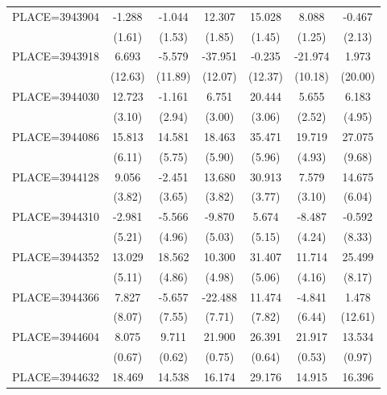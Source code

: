 {\begin{tabular}{l*{6}{c}}
PLACE=3943904       &      -1.288&      -1.044&      12.307&      15.028&       8.088&      -0.467\\
                    &      (1.61)&      (1.53)&      (1.85)&      (1.45)&      (1.25)&      (2.13)\\
PLACE=3943918       &       6.693&      -5.579&     -37.951&      -0.235&     -21.974&       1.973\\
                    &     (12.63)&     (11.89)&     (12.07)&     (12.37)&     (10.18)&     (20.00)\\
PLACE=3944030       &      12.723&      -1.161&       6.751&      20.444&       5.655&       6.183\\
                    &      (3.10)&      (2.94)&      (3.00)&      (3.06)&      (2.52)&      (4.95)\\
PLACE=3944086       &      15.813&      14.581&      18.463&      35.471&      19.719&      27.075\\
                    &      (6.11)&      (5.75)&      (5.90)&      (5.96)&      (4.93)&      (9.68)\\
PLACE=3944128       &       9.056&      -2.451&      13.680&      30.913&       7.579&      14.675\\
                    &      (3.82)&      (3.65)&      (3.82)&      (3.77)&      (3.10)&      (6.04)\\
PLACE=3944310       &      -2.981&      -5.566&      -9.870&       5.674&      -8.487&      -0.592\\
                    &      (5.21)&      (4.96)&      (5.03)&      (5.15)&      (4.24)&      (8.33)\\
PLACE=3944352       &      13.029&      18.562&      10.300&      31.407&      11.714&      25.499\\
                    &      (5.11)&      (4.86)&      (4.98)&      (5.06)&      (4.16)&      (8.17)\\
PLACE=3944366       &       7.827&      -5.657&     -22.488&      11.474&      -4.841&       1.478\\
                    &      (8.07)&      (7.55)&      (7.71)&      (7.82)&      (6.44)&     (12.61)\\
PLACE=3944604       &       8.075&       9.711&      21.900&      26.391&      21.917&      13.534\\
                    &      (0.67)&      (0.62)&      (0.75)&      (0.64)&      (0.53)&      (0.97)\\
PLACE=3944632       &      18.469&      14.538&      16.174&      29.176&      14.915&      16.396\\

\end{tabular}}
